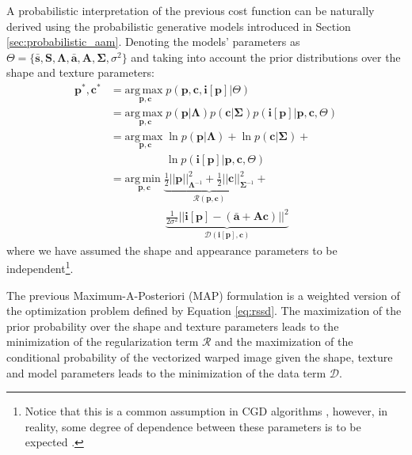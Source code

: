 A probabilistic interpretation of the previous cost function can be naturally derived using the probabilistic generative models introduced in Section \ref{sec:probabilistic_aam}. Denoting the models' parameters as \mbox{$\Theta = \{\mathbf{\bar{s}}, \mathbf{S}, \mathbf{\Lambda}, \mathbf{\bar{a}}, \mathbf{A}, \mathbf{\Sigma}, \sigma^2\}$} and taking into account the prior distributions over the shape and texture parameters:
\begin{equation}
    \begin{aligned}
        \mathbf{p}^*, \mathbf{c}^* & = \underset{\mathbf{p}, \mathbf{c}}{\mathrm{arg\,max\;}} p(\mathbf{p}, \mathbf{c}, \mathbf{i}[\mathbf{p}] | \Theta) 
        \\
        & = \underset{\mathbf{p}, \mathbf{c}}{\mathrm{arg\,max\;}}  p(\mathbf{p} | \mathbf{\Lambda})  p(\mathbf{c} | \mathbf{\Sigma}) p(\mathbf{i}[\mathbf{p}] |
        \mathbf{p}, \mathbf{c}, \Theta)  
        \\
        & = \underset{\mathbf{p}, \mathbf{c}}{\mathrm{arg\,max\;}}  \ln p(\mathbf{p} | \mathbf{\Lambda}) + \ln p(\mathbf{c} | \mathbf{\Sigma}) +
        \\
        & \qquad \qquad \quad \ln p(\mathbf{i}[\mathbf{p}] | \mathbf{p}, \mathbf{c}, \Theta)
        \\
        & = \underset{\mathbf{p}, \mathbf{c}}{\mathrm{arg\,min\;}}  \underbrace{\frac{1}{2} ||\mathbf{p}||^2_{\mathbf{\Lambda}^{-1}} + \frac{1}{2}||\mathbf{c}||^2_{\mathbf{\Sigma}^{-1}}}_{\mathcal{R}(\mathbf{p}, \mathbf{c})} +
        \\
        & \qquad \qquad \quad \underbrace{ \frac{1}{2\sigma^2} || \mathbf{i}[\mathbf{p}] - (\mathbf{\bar{a}} + \mathbf{A} \mathbf{c}) ||^2}_{\mathcal{D}(\mathbf{i}[\mathbf{p}], \mathbf{c})} 
    \end{aligned}
    \label{eq:prob_rssd}
\end{equation}
where we have assumed the shape and appearance parameters to be independent\footnote{Notice that this is a common assumption in CGD algorithms \cite{Matthews2004}, however, in reality, some degree of dependence between these parameters is to be expected \cite{Cootes2001}.}.

The previous Maximum-A-Posteriori (MAP) formulation is a weighted version of the optimization problem defined by Equation \ref{eq:rssd}. The maximization of the prior probability over the shape and texture parameters leads to the minimization of the regularization term $\mathcal{R}$ and the maximization of the conditional probability of the vectorized warped image given the shape, texture and model parameters leads to the minimization of the data term $\mathcal{D}$.


